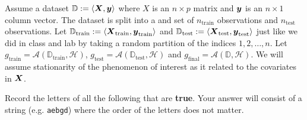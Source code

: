 \documentclass[12pt]{article}
\begin{document}
\eenum


\problem Assume a dataset $\mathbb{D} := \left<\boldsymbol{X}, \boldsymbol{y}\right>$ where $X$ is an $n \times p$ matrix and $\boldsymbol{y}$ is an $n \times 1$ column vector. The dataset is split into a  and  set of $n_{\text{train}}$ observations and $n_{\text{test}}$ observations. Let $\mathbb{D}_{\text{train}} := \left<\boldsymbol{X}_{\text{train}}, \boldsymbol{y}_{\text{train}}\right>$ and $\mathbb{D}_{\text{test}} := \left<\boldsymbol{X}_{\text{test}}, \boldsymbol{y}_{\text{test}}\right>$ just like we did in class and lab by taking a random partition of the indices $1, 2, \ldots, n$. Let $g_{\text{train}} = \mathcal{A}(\mathbb{D}_{\text{train}}, \mathcal{H})$, $g_{\text{test}} = \mathcal{A}(\mathbb{D}_{\text{test}}, \mathcal{H})$ and $ g_{\text{final}} = \mathcal{A}(\mathbb{D}, \mathcal{H})$. We will assume stationarity of the phenomenon of interest as it related to the covariates in $\boldsymbol{X}$.

\benum

 Record the letters of all the following that are \textbf{true}. Your answer will consist of a string (e.g. \texttt{aebgd}) where the order of the letters does not matter.
\end{document}
